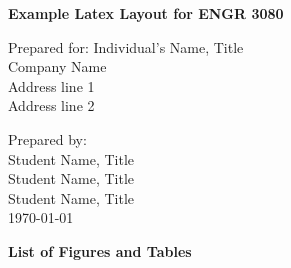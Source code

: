 \documentclass[12pt]{article}
\date{}
\makeatletter
\newcommand \Dotfill {\leavevmode \cleaders \hb@xt@ .8em{\hss .\hss }\hfill \kern \z@}
\newcommand{\ProposalTitle}{Example Latex Layout for ENGR 3080}
\newcommand{\preparee}{Individual's Name}
\newcommand{\prepareeTitle}{Title}
\newcommand{\company}{Company Name}
\newcommand{\address}{Address line 1\\Address line 2}
\newcommand{\titlepagefigure}{Title Page Figure}
\newif\iftitlefigure
\makeatother
\begin{document}
\hypersetup{pageanchor=false}
\begin{titlepage}
\centering
\linespread{1.6}
{\Large\bfseries\ProposalTitle}\\
\vspace{1cm}
\begin{large}
Prepared for:
\preparee, \prepareeTitle\\
\company\\
\address\\
\end{large}
\vspace{1.5cm}

\iftitlefigure
	\begin{figure}[!ht]
		\centering
		\begin{minipage}{8cm}
		\texttt{[image: swarmplot]}
		\caption*{\textbf{Swarm Plot Graph.} \textit{This is some caption text.}}
		\end{minipage}
		\label{fig:titlepage}
	\end{figure}
	\stepcounter{figure}
\fi

\begin{large}
Prepared by:\\
Student Name, Title\\
Student Name, Title\\
Student Name, Title\\
\vspace{1cm}
\today\\
\end{large}

\vspace{1.5cm}



\end{titlepage}
\hypersetup{pageanchor=true}

\setcounter{page}{1}



\clearpage
\tableofcontents
\clearpage

\begin{center}
{\fontsize{18pt}{24pt}\bfseries List of Figures and Tables}
\end{center}
\iftitlefigure
	{\hspace{6mm}\fontsize{14pt}{15pt}\hyperref[fig:titlepage]{Figure \thefigure. \titlepagefigure} \Dotfill Title Page}
\fi
\end{document}

